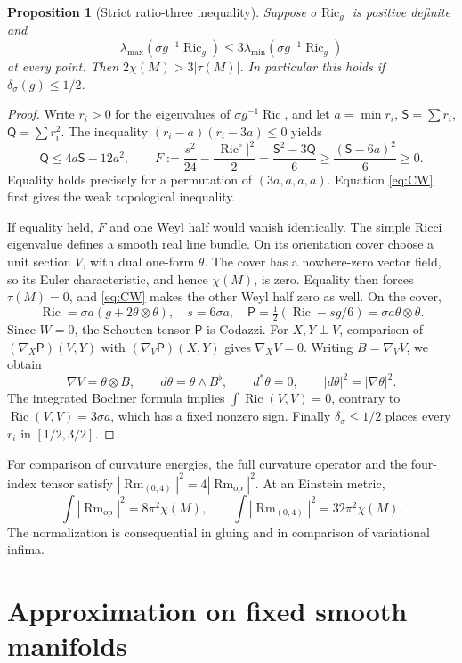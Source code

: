\documentclass[11pt,a4paper]{article}
\newtheorem{proposition}[theorem]{Proposition}
\theoremstyle{definition}\newtheorem{definition}[theorem]{Definition}
\theoremstyle{remark}\newtheorem{remark}[theorem]{Remark}
\DeclareMathOperator{\Ric}{Ric}
\DeclareMathOperator{\Rm}{Rm}
\newcommand{\op}{\mathrm{op}}
\newcommand{\Riczero}{\Ric^{\circ}}
\begin{document}
\begin{proposition}[Strict ratio-three inequality]\label{prop:pinching}
Suppose $\sigma\Ric_g$ is positive definite and
\[
 \lambda_{\max}(\sigma g^{-1}\Ric_g)
       \le3\lambda_{\min}(\sigma g^{-1}\Ric_g)
\]
at every point. Then $2\chi(M)>3|\tau(M)|$. In particular this holds if $\delta_\sigma(g)\le1/2$.
\end{proposition}
\begin{proof}
Write $r_i>0$ for the eigenvalues of $\sigma g^{-1}\Ric$, and let $a=\min r_i$, $\mathsf S=\sum r_i$, $\mathsf Q=\sum r_i^2$. The inequality $(r_i-a)(r_i-3a)\le0$ yields
\[
 \mathsf Q\le4a\mathsf S-12a^2,\qquad
 F:=\frac{s^2}{24}-\frac{|\Riczero|^2}{2}
 =\frac{\mathsf S^2-3\mathsf Q}{6}
 \ge\frac{(\mathsf S-6a)^2}{6}\ge0.
\]
Equality holds precisely for a permutation of $(3a,a,a,a)$. Equation \eqref{eq:CW} first gives the weak topological inequality.

If equality held, $F$ and one Weyl half would vanish identically. The simple Ricci eigenvalue defines a smooth real line bundle. On its orientation cover choose a unit section $V$, with dual one-form $\theta$. The cover has a nowhere-zero vector field, so its Euler characteristic, and hence $\chi(M)$, is zero. Equality then forces $\tau(M)=0$, and \eqref{eq:CW} makes the other Weyl half zero as well. On the cover,
\[
 \Ric=\sigma a(g+2\theta\otimes\theta),\quad s=6\sigma a,
 \quad \mathsf P=\tfrac12(\Ric-sg/6)=\sigma a\theta\otimes\theta.
\]
Since $W=0$, the Schouten tensor $\mathsf P$ is Codazzi. For $X,Y\perp V$, comparison of $(\nabla_X\mathsf P)(V,Y)$ with $(\nabla_V\mathsf P)(X,Y)$ gives $\nabla_XV=0$. Writing $B=\nabla_VV$, we obtain
\[
 \nabla V=\theta\otimes B,\qquad
 d\theta=\theta\wedge B^\flat,\qquad
 d^*\theta=0,\qquad |d\theta|^2=|\nabla\theta|^2.
\]
The integrated Bochner formula implies $\int\Ric(V,V)=0$, contrary to $\Ric(V,V)=3\sigma a$, which has a fixed nonzero sign. Finally $\delta_\sigma\le1/2$ places every $r_i$ in $[1/2,3/2]$.
\end{proof}
For comparison of curvature energies, the full curvature operator and the four-index tensor satisfy $|\Rm_{(0,4)}|^2=4|\Rm_\op|^2$. At an Einstein metric,
\[
 \int|\Rm_\op|^2=8\pi^2\chi(M),\qquad
 \int|\Rm_{(0,4)}|^2=32\pi^2\chi(M).
\]
The normalization is consequential in gluing and in comparison of variational infima.

\section{Approximation on fixed smooth manifolds}
\end{document}
